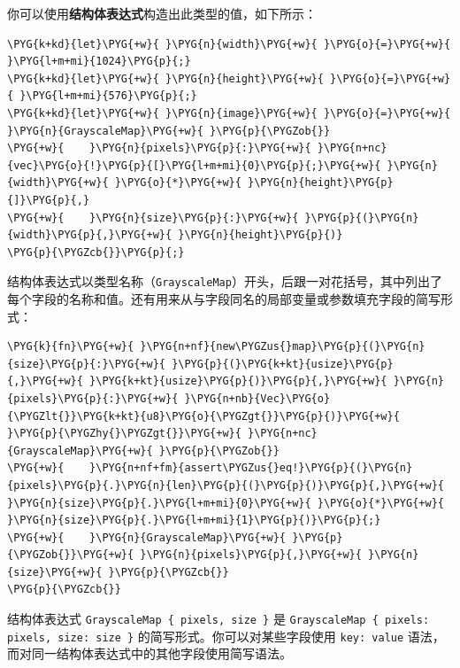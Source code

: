 你可以使用\textbf{结构体表达式}构造出此类型的值，如下所示：

\begin{Verbatim}[commandchars=\\\{\},breaklines=true,breakanywhere=true,fontsize=\codefont,xleftmargin=17bp]
\PYG{k+kd}{let}\PYG{+w}{ }\PYG{n}{width}\PYG{+w}{ }\PYG{o}{=}\PYG{+w}{ }\PYG{l+m+mi}{1024}\PYG{p}{;}
\PYG{k+kd}{let}\PYG{+w}{ }\PYG{n}{height}\PYG{+w}{ }\PYG{o}{=}\PYG{+w}{ }\PYG{l+m+mi}{576}\PYG{p}{;}
\PYG{k+kd}{let}\PYG{+w}{ }\PYG{n}{image}\PYG{+w}{ }\PYG{o}{=}\PYG{+w}{ }\PYG{n}{GrayscaleMap}\PYG{+w}{ }\PYG{p}{\PYGZob{}}
\PYG{+w}{    }\PYG{n}{pixels}\PYG{p}{:}\PYG{+w}{ }\PYG{n+nc}{vec}\PYG{o}{!}\PYG{p}{[}\PYG{l+m+mi}{0}\PYG{p}{;}\PYG{+w}{ }\PYG{n}{width}\PYG{+w}{ }\PYG{o}{*}\PYG{+w}{ }\PYG{n}{height}\PYG{p}{]}\PYG{p}{,}
\PYG{+w}{    }\PYG{n}{size}\PYG{p}{:}\PYG{+w}{ }\PYG{p}{(}\PYG{n}{width}\PYG{p}{,}\PYG{+w}{ }\PYG{n}{height}\PYG{p}{)}
\PYG{p}{\PYGZcb{}}\PYG{p}{;}
\end{Verbatim}

结构体表达式以类型名称（\texttt{GrayscaleMap}）开头，后跟一对花括号，其中列出了每个字段的名称和值。还有用来从与字段同名的局部变量或参数填充字段的简写形式：

\begin{Verbatim}[commandchars=\\\{\},breaklines=true,breakanywhere=true,fontsize=\codefont,xleftmargin=17bp]
\PYG{k}{fn}\PYG{+w}{ }\PYG{n+nf}{new\PYGZus{}map}\PYG{p}{(}\PYG{n}{size}\PYG{p}{:}\PYG{+w}{ }\PYG{p}{(}\PYG{k+kt}{usize}\PYG{p}{,}\PYG{+w}{ }\PYG{k+kt}{usize}\PYG{p}{)}\PYG{p}{,}\PYG{+w}{ }\PYG{n}{pixels}\PYG{p}{:}\PYG{+w}{ }\PYG{n+nb}{Vec}\PYG{o}{\PYGZlt{}}\PYG{k+kt}{u8}\PYG{o}{\PYGZgt{}}\PYG{p}{)}\PYG{+w}{ }\PYG{p}{\PYGZhy{}\PYGZgt{}}\PYG{+w}{ }\PYG{n+nc}{GrayscaleMap}\PYG{+w}{ }\PYG{p}{\PYGZob{}}
\PYG{+w}{    }\PYG{n+nf+fm}{assert\PYGZus{}eq!}\PYG{p}{(}\PYG{n}{pixels}\PYG{p}{.}\PYG{n}{len}\PYG{p}{(}\PYG{p}{)}\PYG{p}{,}\PYG{+w}{ }\PYG{n}{size}\PYG{p}{.}\PYG{l+m+mi}{0}\PYG{+w}{ }\PYG{o}{*}\PYG{+w}{ }\PYG{n}{size}\PYG{p}{.}\PYG{l+m+mi}{1}\PYG{p}{)}\PYG{p}{;}
\PYG{+w}{    }\PYG{n}{GrayscaleMap}\PYG{+w}{ }\PYG{p}{\PYGZob{}}\PYG{+w}{ }\PYG{n}{pixels}\PYG{p}{,}\PYG{+w}{ }\PYG{n}{size}\PYG{+w}{ }\PYG{p}{\PYGZcb{}}
\PYG{p}{\PYGZcb{}}
\end{Verbatim}

结构体表达式 \texttt{GrayscaleMap \{ pixels, size \}} 是 \texttt{GrayscaleMap \{ pixels: pixels, size: size \}} 的简写形式。你可以对某些字段使用 \texttt{key: value} 语法，而对同一结构体表达式中的其他字段使用简写语法。

